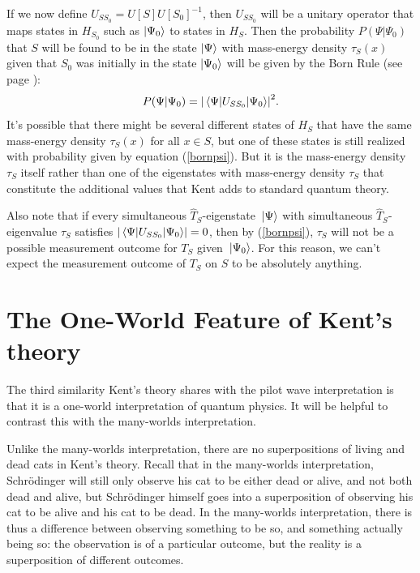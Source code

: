  If we now define $U_{SS_0}=U[S]U[S_0]^{-1}$,\label{SchwingerUnitaryOP} then $U_{SS_0}$ will be a unitary operator that maps states in $H_{S_0}$ such as $\ket{\Psi_0}$ to states in $H_S$. Then the probability $P(\Psi|\Psi_0)$ that  $S$ will be found to be in the state $\ket{\Psi}$ with mass-energy density $\tau_S(x)$ given that $S_0$ was initially in the state $\ket{\Psi_0}$ will be given by the Born Rule (see page \pageref{bornrule}):
 \begin{equation}\label{bornpsi}
 P(\Psi|\Psi_0) = \abs{\mel{\Psi}{U_{SS_0}}{\Psi_0}}^2.
 \end{equation}
It's possible that there might be several different states of $H_S$ that have the same mass-energy density $\tau_S(x)$ for all $x\in S$, but one of these states is still realized with probability given by equation (\ref{bornpsi}). But it is the mass-energy density $\tau_S$ itself rather than one of the eigenstates with mass-energy density $\tau_S$ that constitute the additional values that Kent adds to standard quantum theory. 

Also note that  if every simultaneous $\hat{T}_S$-eigenstate $\ket*{\Psi}$ with simultaneous $\hat{T}_S$-eigenvalue $\tau_S$ satisfies $\abs{\mel{\Psi}{U_{SS_0}}{\Psi_0}}=0$, then by (\ref{bornpsi}), $\tau_S$ will not be a possible measurement outcome for $T_S$ given $\ket*{\Psi_0}$. For this reason, we can't expect the measurement outcome of $T_S$ on $S$ to be absolutely anything.

\section{The One-World Feature of Kent's theory}
The third similarity Kent's theory shares with the pilot wave interpretation is that it is a one-world interpretation of quantum physics. It will be helpful to contrast this with the many-worlds interpretation. 

Unlike the many-worlds interpretation, there are no superpositions of living and dead cats in Kent's theory. Recall that in the many-worlds interpretation, Schr\"{o}dinger will still only observe his cat to be either dead or alive, and not both dead and alive, but Schr\"{o}dinger himself goes into a superposition of observing his cat to be alive and his cat to be dead. In the many-worlds interpretation, there is thus a difference between observing something to be so, and something actually being so: the observation is of a particular outcome, but the reality is a superposition of different outcomes. 

